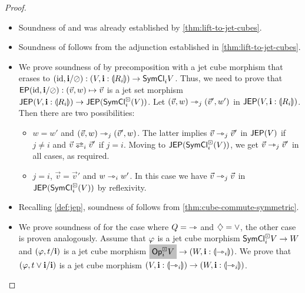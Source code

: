\documentclass[a4paper]{memoir}
\begin{document}
\begin{proof}
\begin{itemize}
		\item Soundness of  and  was already established by \cref{thm:lift-to-jet-cubes}.
		
		\item Soundness of  follows from the adjunction established in \cref{thm:lift-to-jet-cubes}.
		
		\item We prove soundness of  by precomposition with a jet cube morphism that erases to $(\mathrm{id}, \mathbf{i} / \oslash) : (V, \mathbf{i} : {\llparenthesis R_i \rrparenthesis}) \to \mathsf{SymCl}_i V$.
		Thus, we need to prove that $\mathsf{EP}(\mathrm{id}, \mathbf{i} / \oslash) : (\vec v, w) \mapsto \vec v$ is a jet set morphism $\mathsf{JEP}(V, \mathbf{i} : {\llparenthesis R_i \rrparenthesis})
		\to \mathsf{JEP}(\mathsf{SymCl}^\boxdot_i(V))$.
		Let $(\vec v, w) \rightarrowtriangle_j (\vec v', w')$ in $\mathsf{JEP}(V, \mathbf{i} : {\llparenthesis R_i \rrparenthesis})$.
		Then there are two possibilities:
		\begin{itemize}
			\item $w = w'$ and $(\vec v, w) \rightarrowtriangle_j (\vec v', w)$. The latter implies $\vec v \rightarrowtriangle_j \vec v'$ in $\mathsf{JEP}(V)$ if $j \neq i$ and $\vec v \infrajet_i \vec v'$ if $j = i$. Moving to $\mathsf{JEP}(\mathsf{SymCl}^\boxdot_i(V))$, we get $\vec v \rightarrowtriangle_j \vec v'$ in all cases, as required.
			\item $j = i$, $\vec v = \vec v'$ and $w \rightarrowtriangle_i w'$. In this case we have $\vec v \rightarrowtriangle_j \vec v$ in $\mathsf{JEP}(\mathsf{SymCl}^\boxdot_i(V))$ by reflexivity.
		\end{itemize}
		
		\item Recalling \cref{def:jep}, soundness of  follows from \cref{thm:cube-commute-symmetric}.
		
		\item We prove soundness of  for the case where $Q = {\rightarrowtriangle}$ and $\mathbin{\diamondsuit} = \vee$, the other case is proven analogously.
		Assume that $\varphi$ is a jet cube morphism $\mathsf{SymCl}^\boxdot_i V \to W$ and $(\varphi, t / \mathbf{i})$ is a jet cube morphism $\mathemph{\Opcube_i V} \to (W, \dm i : \rival{\jet_i})$.
		We prove that $(\varphi, t \vee \mathbf{i} / \mathbf{i})$ is a jet cube morphism $(V, \mathbf{i} : {\llparenthesis \rightarrowtriangle_i \rrparenthesis}) \to (W, \mathbf{i} : {\llparenthesis \rightarrowtriangle_i \rrparenthesis})$.
		

\end{itemize}
\end{proof}
\end{document}
